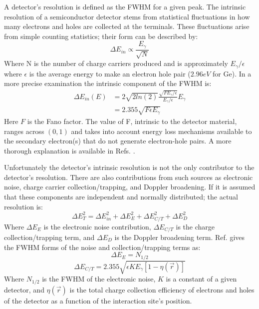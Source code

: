A detector's resolution is defined as the FWHM for a given peak. The intrinsic resolution of a semiconductor detector stems from statistical fluctuations in how many electrons and holes are collected at the terminals. These fluctuations arise from simple counting statistics; their form can be described by:
\begin{equation}
\label{eqn:chp3-hpge-res-est} 
\Delta{}E_{in} \propto \frac{E_{\gamma}}{\sqrt{N}}
\end{equation}
Where N is the number of charge carriers produced and is approximately $E_{\gamma}/\epsilon$ where $\epsilon$ is the average energy to make an electron hole pair ($2.96eV$ for Ge). In a more precise examination the intrinsic component of the FWHM is:
\begin{equation}
\label{eqn:chp3-hpge-in-res} 
\begin{split}
\Delta{}E_{in}(E) & = 2\sqrt{2 ln(2)}\frac{\sqrt{F E_{\gamma{}}/\epsilon{}}}{E_{\gamma{}}/\epsilon{}}E_{\gamma{}}\\
       & = 2.355\sqrt{F\epsilon{}E_{\gamma{}}}
\end{split}
\end{equation}
Here $F$ is the Fano factor. The value of F, intrinsic to the detector material, ranges across $(0,1)$ and takes into account energy loss mechanisms available to the secondary electron(s) that do not generate electron-hole pairs. A more thorough explanation is available in Refs. \cite{fano_factor1,knollBook}.

Unfortunately the detector's intrinsic resolution is not the only contributor to the detector's resolution. There are also contributions from such sources as electronic noise, charge carrier collection/trapping, and Doppler broadening. If it is assumed that these components are independent and normally distributed; the actual resolution is:
\begin{equation}
\label{eqn:chp3-hpge-res} 
\Delta{}E_{T}^2 = \Delta{}E_{in}^2 + \Delta{}E_{E}^2 + \Delta{}E_{C/T}^2 + \Delta{}E_{D}^2
\end{equation}
Where $\Delta{}E_{E}$ is the electronic noise contribution, $\Delta{}E_{C/T}$ is the charge collection/trapping term, and $\Delta{}E_{D}$ is the Doppler broadening term. Ref. \cite{trappingResolution} gives the FWHM forms of the noise and collection/trapping terms as:
\begin{equation}
\label{eqn:chp3-hpge-res-noise} 
\Delta{}E_{E} = N_{1/2}
\end{equation}
\begin{equation}
\label{eqn:chp3-hpge-res-ct} 
\Delta{}E_{C/T} = 2.355\sqrt{\epsilon{} K E_{\gamma{}} [1-\eta{}(\vec{r})]}
\end{equation}
Where $N_{1/2}$ is the FWHM of the electronic noise, $K$ is a constant of a given detector, and $\eta{}(\vec{r})$ is the total charge collection efficiency of electrons and holes of the detector as a function of the interaction site's position.

